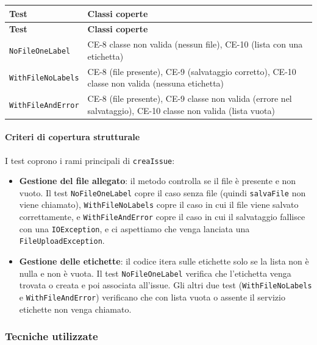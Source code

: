 \begin{longtable}{|p{6cm}|p{8.5cm}|}
\hline
\textbf{Test} & \textbf{Classi coperte} \\
\hline
\endfirsthead
\hline
\textbf{Test} & \textbf{Classi coperte} \\
\hline
\endhead
\texttt{NoFileOneLabel} &
CE-8 classe non valida (nessun file), CE-10 (lista con una etichetta) \\
\hline
\texttt{WithFileNoLabels} &
CE-8 (file presente), CE-9 (salvataggio corretto), CE-10 classe non valida (nessuna etichetta) \\
\hline
\texttt{WithFileAndError} &
CE-8 (file presente), CE-9 classe non valida (errore nel salvataggio), CE-10 classe non valida (lista vuota) \\
\hline
\end{longtable}

\paragraph{Criteri di copertura strutturale}

I test coprono i rami principali di \texttt{creaIssue}:

\begin{itemize}
    \item \textbf{Gestione del file allegato}: il metodo controlla se il file \`e presente e non vuoto. Il test \texttt{NoFileOneLabel} copre il caso senza file (quindi \texttt{salvaFile} non viene chiamato), \texttt{WithFileNoLabels} copre il caso in cui il file viene salvato correttamente, e \texttt{WithFileAndError} copre il caso in cui il salvataggio fallisce con una \texttt{IOException}, e ci aspettiamo che venga lanciata una \texttt{FileUploadException}.

    \item \textbf{Gestione delle etichette}: il codice itera sulle etichette solo se la lista non \`e nulla e non \`e vuota. Il test \texttt{NoFileOneLabel} verifica che l'etichetta venga trovata o creata e poi associata all'issue. Gli altri due test (\texttt{WithFileNoLabels} e \texttt{WithFileAndError}) verificano che con lista vuota o assente il servizio etichette non venga chiamato.
\end{itemize}

\subsubsection{Tecniche utilizzate}

